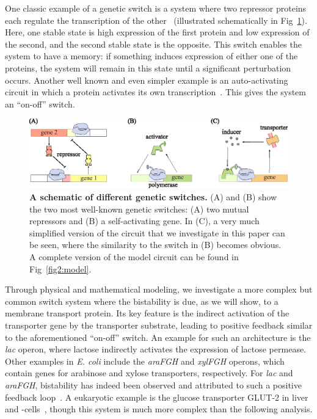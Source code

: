 \documentclass[10pt,letterpaper]{article}
\begin{document}
One classic example of a genetic switch is a system where two repressor
proteins each regulate the transcription of the
other~\cite{Jacob1961,Gardner2000} (illustrated schematically in
Fig~\ref{fig1:switches}). Here, one stable state is high expression of
the first protein and low expression of the second,
and the second stable state is the opposite. This
switch enables the system to have a memory: if something induces expression
of either one of the proteins, the system will remain in this state until a
significant perturbation occurs. Another well known and even simpler example
is an auto-activating circuit in which a protein activates its own
transcription~\cite{Wolf1998}. This gives the system an ``on-off'' switch.

\begin{figure}%
	\centering
	\includegraphics{media/Circuits.eps}
	\caption{{\bf A schematic of different genetic switches.}
	(A) and (B) show the two most well-known genetic switches:
	(A) two mutual repressors and (B) a self-activating gene.
	In (C), a very much simplified version of the
	circuit that we investigate in this paper can be seen, where the
	similarity to the switch in (B) becomes obvious. A complete version of
	the model circuit can be found in Fig~\ref{fig2:model}.}
	\label{fig1:switches}
\end{figure}

Through physical and mathematical modeling, we investigate a more complex
but common switch system where the bistability is due, as we will show, to a
membrane transport protein. Its key feature is the indirect activation of
the transporter gene by the transporter substrate, leading to positive
feedback similar to the aforementioned ``on-off'' switch. An example for
such an architecture is the \emph{lac} operon, where lactose indirectly
activates the expression of lactose permease. Other examples in \emph{E.
coli} include the \emph{araFGH} and \emph{xylFGH} operons, which contain genes for
arabinose and xylose transporters, respectively. For \emph{lac} and
\emph{araFGH}, bistability has indeed been observed and attributed to such a
positive feedback
loop~\cite{Novick1957,Narang2008,Choi2008,Ozbudak2004,Fritz2014,Jenkins2017,Siegele1997}.
A eukaryotic example is the glucose transporter GLUT-2 in liver and
\textbeta-cells~\cite{Bae2010,Tiedge1991}, though this system is much more
complex than the following analysis. 
\end{document}
